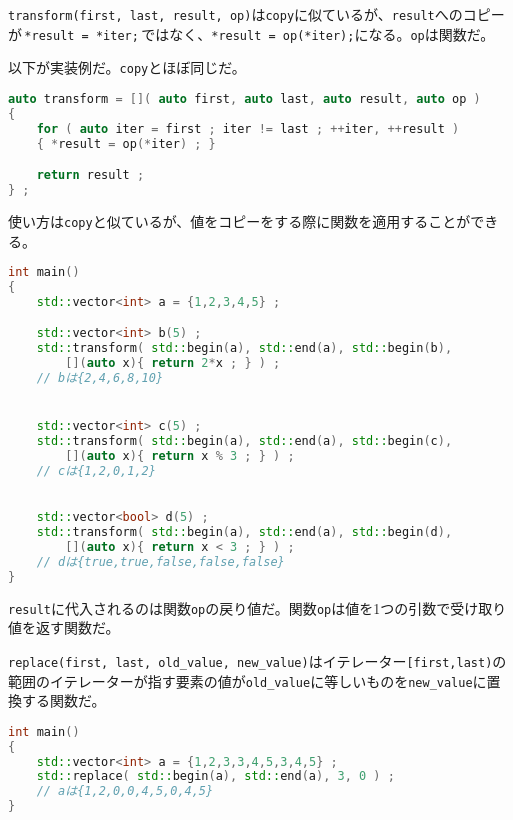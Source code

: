 \clearpage
{}

\texttt{transform(first, last, result, op)}は\texttt{copy}に似ているが、\texttt{result}へのコピーが\,\texttt{*result = *iter;}\,ではなく、\texttt{*result = op(*iter);}になる。\texttt{op}は関数だ。

以下が実装例だ。\texttt{copy}とほぼ同じだ。

\begin{lstlisting}[language={C++}]
auto transform = []( auto first, auto last, auto result, auto op )
{
    for ( auto iter = first ; iter != last ; ++iter, ++result )
    { *result = op(*iter) ; }

    return result ;
} ;
\end{lstlisting}

使い方は\texttt{copy}と似ているが、値をコピーをする際に関数を適用することができる。

\begin{lstlisting}[language={C++}]
int main()
{
    std::vector<int> a = {1,2,3,4,5} ;

    std::vector<int> b(5) ;
    std::transform( std::begin(a), std::end(a), std::begin(b),
        [](auto x){ return 2*x ; } ) ;
    // bは{2,4,6,8,10}


    std::vector<int> c(5) ;
    std::transform( std::begin(a), std::end(a), std::begin(c),
        [](auto x){ return x % 3 ; } ) ;
    // cは{1,2,0,1,2}

    
    std::vector<bool> d(5) ;
    std::transform( std::begin(a), std::end(a), std::begin(d),
        [](auto x){ return x < 3 ; } ) ;
    // dは{true,true,false,false,false}
}
\end{lstlisting}

\texttt{result}に代入されるのは関数\texttt{op}の戻り値だ。関数\texttt{op}は値を1つの引数で受け取り値を返す関数だ。

\clearpage
{}

\texttt{replace(first, last, old\_value, new\_value)}はイテレーター\texttt{[first,last)}の範囲のイテレーターが指す要素の値が\texttt{old\_value}に等しいものを\texttt{new\_value}に置換する関数だ。

\begin{lstlisting}[language={C++}]
int main()
{
    std::vector<int> a = {1,2,3,3,4,5,3,4,5} ;
    std::replace( std::begin(a), std::end(a), 3, 0 ) ;
    // aは{1,2,0,0,4,5,0,4,5}
}
\end{lstlisting}

